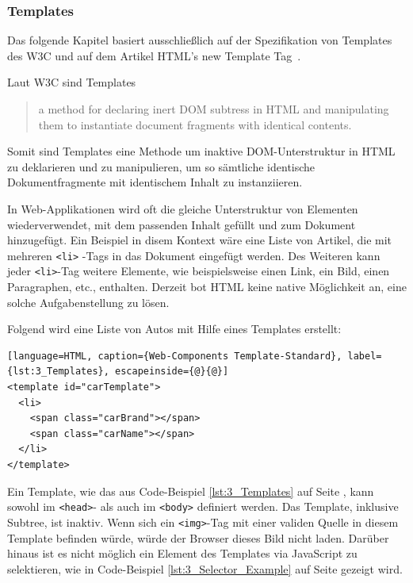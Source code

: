 \subsubsection{Templates}
\label{sec:3_WC_Templates}

Das folgende Kapitel basiert ausschließlich auf der Spezifikation von Templates des W3C \citereset \autocite[siehe][]{Weinstein.2013} und auf dem Artikel \glqq HTML's new Template Tag\grqq\ \citereset \autocite[siehe][]{BidelmanTemplate.2013}.

Laut W3C sind Templates
\begin{quote}
\glqq
  a method for declaring inert DOM subtress in HTML and manipulating them to instantiate document fragments with identical contents.
\grqq
\end{quote}
Somit sind Templates eine Methode um inaktive DOM-Unterstruktur in HTML zu deklarieren und zu manipulieren, um so sämtliche identische Dokumentfragmente mit identischem Inhalt zu instanziieren.

In Web-Applikationen wird oft die gleiche Unterstruktur von Elementen wiederverwendet, mit dem passenden Inhalt gefüllt und zum Dokument hinzugefügt. Ein Beispiel in disem Kontext wäre eine Liste von Artikel, die mit mehreren \lstinline|<li>| -Tags in das Dokument eingefügt werden. Des Weiteren kann jeder \lstinline|<li>|-Tag weitere Elemente, wie beispielsweise einen Link, ein Bild, einen Paragraphen, etc., enthalten. Derzeit bot HTML keine native Möglichkeit an, eine solche Aufgabenstellung zu lösen.

Folgend wird eine Liste von Autos mit Hilfe eines Templates erstellt:
\begin{lstlisting}[language=HTML, caption={Web-Components Template-Standard}, label={lst:3_Templates}, escapeinside={@}{@}]
<template id="carTemplate">
  <li>
    <span class="carBrand"></span>
    <span class="carName"></span>
  </li>
</template>
\end{lstlisting}

Ein Template, wie das aus Code-Beispiel \ref{lst:3_Templates} auf Seite \pageref{lst:3_Templates}, kann sowohl im \lstinline|<head>|- als auch im \lstinline|<body>| definiert werden. Das Template, inklusive Subtree, ist inaktiv. Wenn sich ein \lstinline|<img>|-Tag mit einer validen Quelle in diesem Template befinden würde, würde der Browser dieses Bild nicht laden. Darüber hinaus ist es nicht möglich ein Element des Templates via JavaScript zu selektieren, wie in Code-Beispiel \ref{lst:3_Selector_Example} auf Seite \pageref{lst:3_Selector_Example} gezeigt wird.

